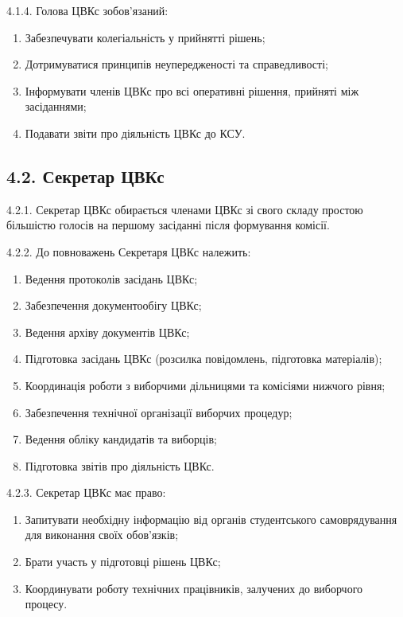     4.1.4. Голова ЦВКс зобов'язаний:

        \begin{enumerate}[label=\alph*)]
            \item Забезпечувати колегіальність у прийнятті рішень;
            \item Дотримуватися принципів неупередженості та справедливості;
            \item Інформувати членів ЦВКс про всі оперативні рішення, прийняті між засіданнями;
            \item Подавати звіти про діяльність ЦВКс до КСУ.
        \end{enumerate}

\subsection*{4.2. Секретар ЦВКс}
    4.2.1. Секретар ЦВКс обирається членами ЦВКс зі свого складу простою більшістю голосів на першому засіданні після формування комісії.

    4.2.2. До повноважень Секретаря ЦВКс належить:

        \begin{enumerate}[label=\alph*)]
            \item Ведення протоколів засідань ЦВКс;
            \item Забезпечення документообігу ЦВКс;
            \item Ведення архіву документів ЦВКс;
            \item Підготовка засідань ЦВКс (розсилка повідомлень, підготовка матеріалів);
            \item Координація роботи з виборчими дільницями та комісіями нижчого рівня;
            \item Забезпечення технічної організації виборчих процедур;
            \item Ведення обліку кандидатів та виборців;
            \item Підготовка звітів про діяльність ЦВКс.
        \end{enumerate}

    4.2.3. Секретар ЦВКс має право:

        \begin{enumerate}[label=\alph*)]
            \item Запитувати необхідну інформацію від органів студентського самоврядування для виконання своїх обов'язків;
            \item Брати участь у підготовці рішень ЦВКс;
            \item Координувати роботу технічних працівників, залучених до виборчого процесу.
        \end{enumerate}

